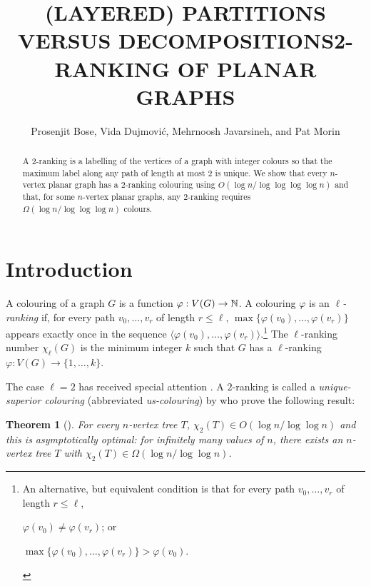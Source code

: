 \documentclass[kpfonts]{patmorin}
\title{\MakeUppercase{(Layered) Partitions versus Decompositions}}
\author{}
\title{\MakeUppercase{2-Ranking of Planar Graphs}}
\author{Prosenjit Bose, Vida Dujmović, Mehrnoosh Javarsineh, and Pat Morin}
\newcommand{\uqs}{\chi_2}
\newtheorem{othertheorem}{Theorem}
\begin{document}
\begin{titlepage}
\maketitle

\begin{abstract}
  A 2-ranking is a labelling of the vertices of a graph with integer colours so that the maximum label along any path of length at most 2 is unique.  We show that every $n$-vertex planar graph has a 2-ranking colouring using $O(\log n/\log\log\log\log n)$ and that, for some $n$-vertex planar graphs, any 2-ranking requires $\Omega(\log n/\log\log\log n)$ colours.
\end{abstract}
\end{titlepage}

\tableofcontents

\newpage
{}

\section{Introduction}


A colouring of a graph $G$ is a function $\varphi:V(G)\to \mathbb{N}$.  A colouring $\varphi$ is an \emph{$\ell$-ranking} if, for every path $v_0,\ldots,v_r$ of length $r\le\ell$, $\max\{\varphi(v_0),\ldots,\varphi(v_r)\}$ appears exactly once in the sequence $\langle \varphi(v_0),\ldots,\varphi(v_r)\rangle$.\footnote{An alternative, but equivalent condition is that for every path $v_0,\ldots,v_r$ of length $r\le\ell$,
\begin{inparaenum}[(i)]
   \item $\varphi(v_0)\neq \varphi(v_r)$; or
   \item $\max\{\varphi(v_0),\ldots,\varphi(v_r)\} > \varphi(v_0)$.
\end{inparaenum}
}
The $\ell$-ranking number $\chi_\ell(G)$ is the minimum integer $k$ such that $G$ has a $\ell$-ranking $\varphi:V(G)\to \{1,\ldots,k\}$.

The case $\ell=2$ has received special attention \cite{almeter.demircan.ea:graph,karpas.neiman.ea:on}. A $2$-ranking is called a \emph{unique-superior colouring} (abbreviated \emph{us-colouring}) by \citet{karpas.neiman.ea:on} who prove the following result:

\setcounter{othertheorem}{19}
\begin{othertheorem}[\cite{karpas.neiman.ea:on}]\label{trees}
    For every $n$-vertex tree $T$, $\uqs(T)\in O(\log n/\log\log n)$ and this is asymptotically optimal: for infinitely many values of $n$, there exists an $n$-vertex tree $T$ with $\uqs(T)\in\Omega(\log n/\log\log n)$.
\end{othertheorem}
\end{document}

